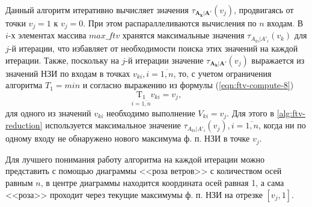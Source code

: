 Данный алгоритм итеративно вычисляет значения $\tau_{\mathbf{A_k}|\mathbf{A'}}(v_j)$, продвигаясь от точки $v_j = 1$ к $v_j = 0$. При этом распараллеливаются вычисления по $n$ входам. В $i$-х элементах массива $max\_ftv$ хранятся максимальные значения $\tau_{A_{ki}|A'_i}(v_k)$ для $j$-й итерации, что избавляет от необходимости поиска этих значений на каждой итерации. Также, поскольку на $j$-й итерации значение $\tau_{\mathbf{A_k}|\mathbf{A'}}(v_j)$ выражается из значений НЗИ по входам в точках $v_{ki}, i=\overline{1,n}$, то, с учетом ограничения алгоритма $T_1 = min$ и согласно выражению из формулы (\ref{eqn:ftv-compute-8})
\[
\underset{i=\overline{1,n}}{\mathrm{T_1}}v_{ki} = v_j,
\]
для одного из значений $v_{ki}$ необходимо выполнение $V_{ki} = v_j$. Для этого в \cref{alg:ftv-reduction} используется максимальное значение $\tau_{A_{ki}|A'_i}(v_j), i=\overline{1,n}$, когда ни по одному входу не обнаружено нового максимума ф. п. НЗИ в точке $v_j$.

Для лучшего понимания работу алгоритма на каждой итерации можно представить с помощью диаграммы <<роза ветров>> с количеством осей равным $n$, в центре диаграммы находится координата осей равная 1, а сама <<роза>> проходит через текущие максимумы ф. п. НЗИ на отрезке $[v_j, 1]$.

